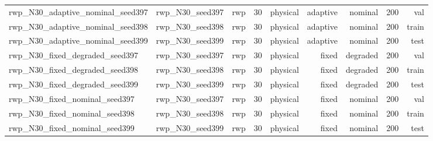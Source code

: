 \begin{tabular}{lrrrrrrrr}
rwp\_N30\_adaptive\_nominal\_seed397 & rwp\_N30\_seed397 & rwp & 30 & physical & adaptive & nominal & 200 & val \\
rwp\_N30\_adaptive\_nominal\_seed398 & rwp\_N30\_seed398 & rwp & 30 & physical & adaptive & nominal & 200 & train \\
rwp\_N30\_adaptive\_nominal\_seed399 & rwp\_N30\_seed399 & rwp & 30 & physical & adaptive & nominal & 200 & test \\
rwp\_N30\_fixed\_degraded\_seed397 & rwp\_N30\_seed397 & rwp & 30 & physical & fixed & degraded & 200 & val \\
rwp\_N30\_fixed\_degraded\_seed398 & rwp\_N30\_seed398 & rwp & 30 & physical & fixed & degraded & 200 & train \\
rwp\_N30\_fixed\_degraded\_seed399 & rwp\_N30\_seed399 & rwp & 30 & physical & fixed & degraded & 200 & test \\
rwp\_N30\_fixed\_nominal\_seed397 & rwp\_N30\_seed397 & rwp & 30 & physical & fixed & nominal & 200 & val \\
rwp\_N30\_fixed\_nominal\_seed398 & rwp\_N30\_seed398 & rwp & 30 & physical & fixed & nominal & 200 & train \\
rwp\_N30\_fixed\_nominal\_seed399 & rwp\_N30\_seed399 & rwp & 30 & physical & fixed & nominal & 200 & test \\
\bottomrule
\end{tabular}
